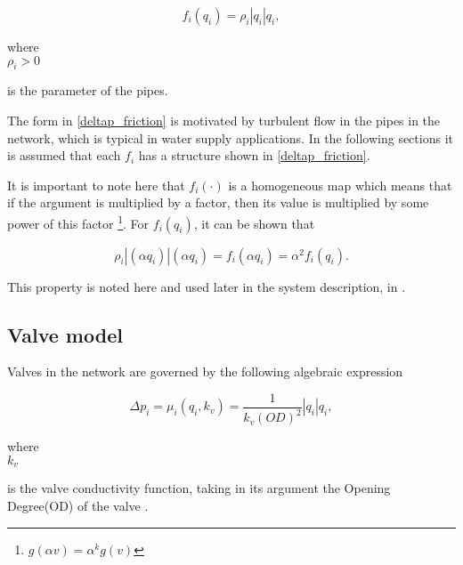 \begin{equation}
  \label{deltap_friction}
  f_i(q_i) = \rho_i |q_i|q_i,
\end{equation}

 \begin{minipage}[t]{0.20\textwidth}
where\\
\hspace*{8mm} $\rho_i > 0$ 
\end{minipage}
\begin{minipage}[t]{0.68\textwidth}
\vspace*{2mm}
is the parameter of the pipes. 
\end{minipage}

The form in \eqref{deltap_friction} is motivated by turbulent flow in the pipes in the network, which is typical in water supply applications\cite{prahata}. In the following sections it is assumed that each $f_i$ has a structure shown in \eqref{deltap_friction}.

It is important to note here that $f_i(\cdot)$ is a homogeneous map which means that if the argument is multiplied by a factor, then its value is multiplied by some power of this factor \footnote{$g(\alpha v) = \alpha^k g(v)$}. For $f_i(q_i)$, it can be shown that

\begin{equation}
  \label{homogeneity}
  \rho_i |(\alpha q_i)|(\alpha q_i) = f_i(\alpha q_i) = \alpha^2 f_i(q_i).
\end{equation}

This property is noted here and used later in the system description, in .

\subsection{Valve model}
\label{valve_component}

Valves in the network are governed by the following algebraic expression

\begin{equation}
\label{valvemodel}
 \Delta p_i = \mu_i(q_i,k_v) = \frac{1}{k_v(OD)^2} |q_i| q_i, 
\end{equation}

 \begin{minipage}[t]{0.20\textwidth}
where\\
\hspace*{8mm} $k_v$ 
\end{minipage}
\begin{minipage}[t]{0.68\textwidth}
\vspace*{2mm}
is the valve conductivity function, taking in its argument the Opening Degree(OD) of the valve \cite{8thsemester_project}.
\end{minipage}

